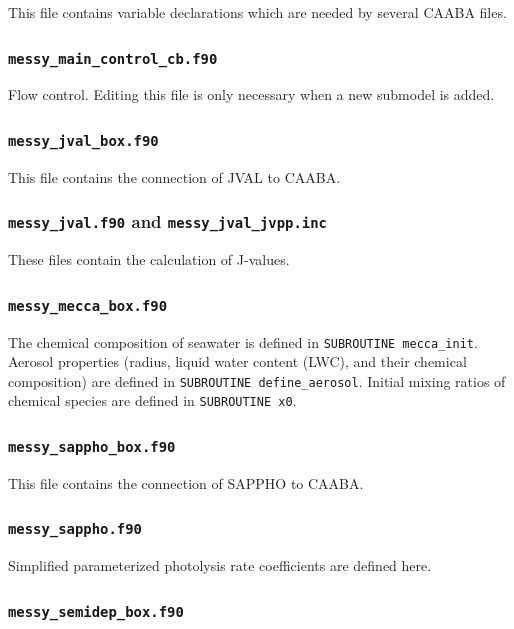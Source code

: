 \documentclass[twoside]{article}
\begin{document}
This file contains variable declarations which are needed by several
CAABA files.

\subsubsection{{\tt messy\_main\_control\_cb.f90}}

Flow control. Editing this file is only necessary when a new submodel is
added.

\subsubsection{{\tt messy\_jval\_box.f90}}

This file contains the connection of JVAL to CAABA.

\subsubsection{{\tt messy\_jval.f90} and {\tt messy\_jval\_jvpp.inc}}

These files contain the calculation of J-values.

\subsubsection{{\tt messy\_mecca\_box.f90}}

The chemical composition of seawater is defined in
\verb|SUBROUTINE mecca_init|. Aerosol properties (radius, liquid water
content (LWC), and their chemical composition) are defined in
\verb|SUBROUTINE define_aerosol|. Initial mixing ratios of chemical
species are defined in \verb|SUBROUTINE x0|.

\subsubsection{{\tt messy\_sappho\_box.f90}}

This file contains the connection of SAPPHO to CAABA.

\subsubsection{{\tt messy\_sappho.f90}}

Simplified parameterized photolysis rate coefficients are defined here.

\subsubsection{{\tt messy\_semidep\_box.f90}}
\end{document}

